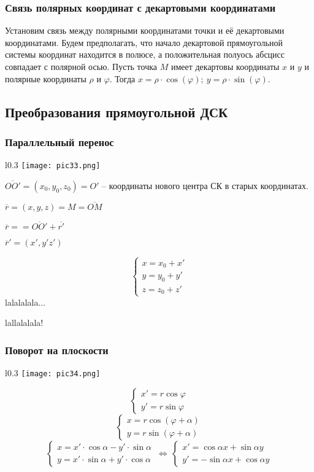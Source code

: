 \documentclass{article}
\begin{document}
\subsubsection{Связь полярных координат с декартовыми координатами}
Установим связь между полярными координатами точки и её декартовыми координатами. Будем предполагать, что начало декартовой прямоугольной системы координат находится в полюсе, а положительная полуось абсцисс совпадает с полярной осью. Пусть точка $M$ имеет декартовы координаты $x$ и $y$ и полярные координаты $\rho$ и $\varphi$. Тогда $x=\rho\cdot\cos(\varphi);\:y=\rho\cdot\sin(\varphi)$.
\subsection{Преобразования прямоугольной ДСК}

\subsubsection{Параллельный перенос}
    \begin{wrapfigure}{l}{0.3\textwidth}
        \centering
        \texttt{[image: pic33.png]}
    \end{wrapfigure}
    $\overline{OO'}=(x_0,y_0,z_0)=O'$ -- координаты нового центра СК в старых координатах.

    $\overline{r}=(x,y,z)=M=\overline{OM}$

    $\overline{r}==\overline{OO'}+\overline{r'}$

    $ \overline{r}'=(x',y'z') $

    $$ \begin{cases}x=x_0+x'\\y=y_0+y'\\z=z_0+z' \end{cases}$$
    lalalalala...

    lallalalala!

\newpage
\subsubsection{Поворот на плоскости}
    \begin{wrapfigure}{l}{0.3\textwidth}
        \centering
        \texttt{[image: pic34.png]}
    \end{wrapfigure}
    $$ \begin{cases} x'=r\cos\varphi \\y'=r\sin\varphi \end{cases}$$
    $$ \begin{cases} x=r\cos(\varphi+\alpha) \\ y=r\sin(\varphi+\alpha) \end{cases} $$
    $$ \begin{cases}x=x'\cdot\cos\alpha-y'\cdot\sin\alpha\\y=x'\cdot\sin\alpha+y'\cdot\cos\alpha\end{cases}\,\Leftrightarrow\,\begin{cases} x'=\cos\alpha x +\sin\alpha y\\y'=-\sin\alpha x+\cos\alpha y \end{cases}$$
\end{document}

